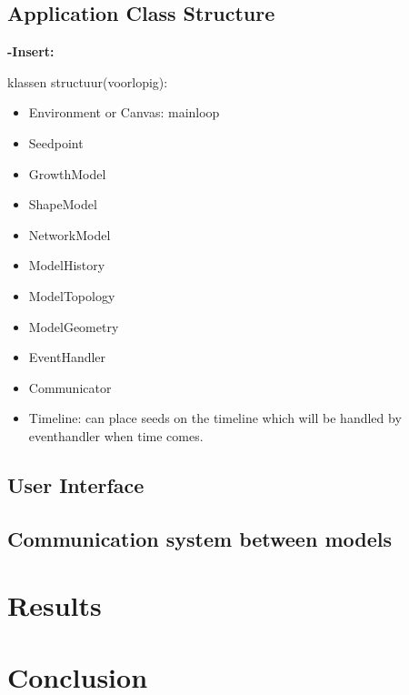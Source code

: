\documentclass{article}
\newcommand{\voegtoe}[1]{\textcolor{MyDarkGreen}{\textbf{-Insert: }\it{#1}}}
\begin{document}
\subsection{Application Class Structure}

\voegtoe{
klassen structuur(voorlopig):
\begin{itemize}
\item Environment or Canvas: mainloop
\item Seedpoint  
\item GrowthModel 
\item ShapeModel
\item NetworkModel
\item ModelHistory
\item ModelTopology
\item ModelGeometry 
\item EventHandler
\item Communicator
\item Timeline: can place seeds on the timeline which will be handled by eventhandler when time comes.  
\end{itemize}
}






\subsection{User Interface}
\subsection{Communication system between models}

\section{Results}

\section{Conclusion}





\newpage 
\end{document}
